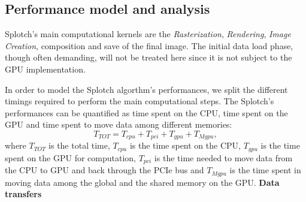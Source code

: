 \documentclass[11pt]{article}
\begin{document}
\subsection{Performance model and analysis}

Splotch's main computational kernels are the {\it Rasterization}, 
{\it Rendering}, {\it Image Creation}, composition and save of 
the final image. The initial data load phase, though often demanding, will not be treated
here since it is not subject to the GPU implementation.

%


In order to model the Splotch algorthm's performances, we split the different timings
required to perform the main computational steps. 
The Splotch's performances can be quantified as time spent on the CPU, time spent on the GPU
and time spent to move data among different memories:
\begin{equation}\label{Ts}
T_{TOT} = T_{cpu} + T_{pci} + T_{gpu} + T_{Mgpu},
\end{equation}
where $T_{TOT}$ is the total time, 
$T_{cpu}$ is the time spent on the CPU, $T_{gpu}$ is the time
spent on the GPU for computation, $T_{pci}$ is the time needed to move data from
the CPU to GPU and back through the PCIe bus and $T_{Mgpu}$ is the time 
spent in moving data among the global and the shared memory on the GPU.
\medskip
\noindent
{\bf Data transfers}
\end{document}
